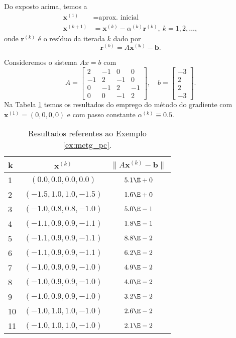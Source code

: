 Do exposto acima, temos a 
\begin{align}
  \pmb{x}^{(1)} &= \text{aprox. inicial}\\
  \pmb{x}^{(k+1)} &= \pmb{x}^{(k)} - \alpha^{(k)}\pmb{r}^{(k)},~k=1, 2, \ldots,
\end{align}
onde $\pmb{r}^{(k)}$ é o resíduo da iterada $k$ dado por
\begin{equation}
  \pmb{r}^{(k)} = A\pmb{x^{(k)}}-\pmb{b}.
\end{equation}

\begin{ex}\label{ex:metg_pc}
  Consideremos o sistema $Ax = b$ com
  \begin{equation}
    A =
    \begin{bmatrix}
      2 & -1 & 0 & 0\\
      -1 & 2 & -1 & 0\\
      0 & -1 & 2 & -1 \\
      0 & 0 & -1 & 2
    \end{bmatrix},\quad
    b =
    \begin{bmatrix}
      -3\\
      2\\
      2\\
      -3
    \end{bmatrix}.
  \end{equation}
  Na Tabela \ref{tab:metg_pc} temos os resultados do emprego do método do gradiente com $\pmb{x}^{(1)} = (0, 0, 0, 0)$ e com passo constante $\alpha^{(k)}\equiv 0.5$.

  \begin{table}[h!]
    \centering
    \caption{Resultados referentes ao Exemplo \ref{ex:metg_pc}.}
    \label{tab:metg_pc}
    \begin{tabular}{l|c|c}
      k & $\pmb{x}^{(k)}$ & $\|A\pmb{x}^{(k)}-\pmb{b}\|$\\\hline
      1 & $(0.0, 0.0, 0.0, 0.0)$ & $5.1\E+0$\\
      2 & $(-1.5, 1.0, 1.0, -1.5)$ & $1.6\E+0$\\
      3 & $(-1.0, 0.8, 0.8, -1.0)$ & $5.0\E-1$\\
      4 & $(-1.1, 0.9, 0.9, -1.1)$ & $1.8\E-1$\\
      5 & $(-1.1, 0.9, 0.9, -1.1)$ & $8.8\E-2$\\
      6 & $(-1.1, 0.9, 0.9, -1.1)$ & $6.2\E-2$\\
      7 & $(-1.0, 0.9, 0.9, -1.0)$ & $4.9\E-2$\\
      8 & $(-1.0, 0.9, 0.9, -1.0)$ & $4.0\E-2$\\
      9 & $(-1.0, 0.9, 0.9, -1.0)$ & $3.2\E-2$\\
      10 & $(-1.0, 1.0, 1.0, -1.0)$ & $2.6\E-2$\\
      11 & $(-1.0, 1.0, 1.0, -1.0)$ & $2.1\E-2$\\\hline
    \end{tabular}
  \end{table}


\end{ex}
